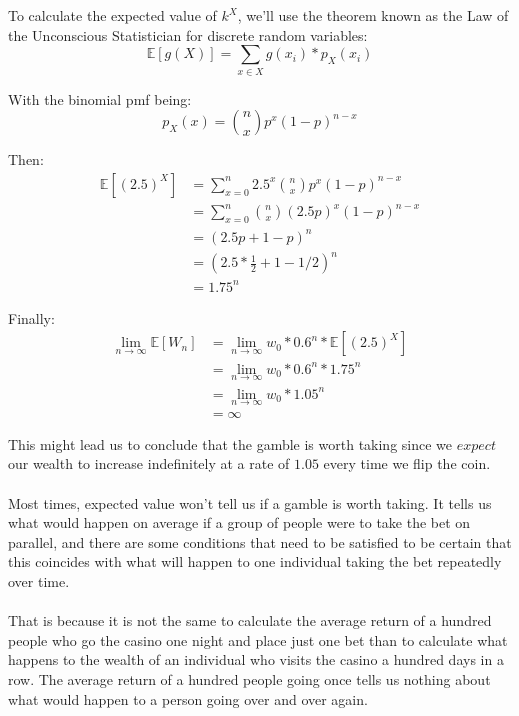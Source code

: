 \documentclass[12pt]{article}
\begin{document}
To calculate the expected value of $k^X$, we'll use the theorem known as the Law of the Unconscious Statistician for discrete random variables:
\begin{equation}
    \mathbb{E}[g(X)] = \sum\limits_{x \in X} g(x_i)*p_X(x_i)
\end{equation}

With the binomial pmf being:
\begin{equation}
    p_X(x) = {n \choose x} p^x (1-p)^{n-x}
\end{equation}

Then:
\begin{equation*}
  \begin{split}
    \mathbb{E}[(2.5)^X] &= \sum\limits_{x=0}^{n} 2.5^x {n \choose x} p^x (1-p)^{n-x}\\
    &= \sum\limits_{x=0}^{n} {n \choose x} (2.5p)^x (1-p)^{n-x}\\
    &= (2.5p + 1 - p)^n\\
    &= (2.5 * \frac{1}{2} + 1 - 1/2)^n\\
    & = 1.75^n
  \end{split}
\end{equation*}

Finally:
\begin{equation*}
  \begin{split}
    \lim_{n\to\infty}\mathbb{E}[W_n] &= \lim_{n\to\infty} w_0 * 0.6^n * \mathbb{E}[(2.5)^X]\\
    &= \lim_{n\to\infty} w_0 * 0.6^n * 1.75^n\\
    &= \lim_{n\to\infty} w_0 * 1.05^n\\
    &= \infty
  \end{split}
\end{equation*}

This might lead us to conclude that the gamble is worth taking since we $expect$ our wealth to increase indefinitely at a rate of $1.05$ every time we flip the coin.
\\\\
Most times, expected value won't tell us if a gamble is worth taking. It tells us what would happen on average if a group of people were to take the bet on parallel, and there are some conditions that need to be satisfied to be certain that this coincides with what will happen to one individual taking the bet repeatedly over time.
\\\\
That is because it is not the same to calculate the average return of a hundred people who go the casino one night and place just one bet than to calculate what happens to the wealth of an individual who visits the casino a hundred days in a row. The average return of a hundred people going once tells us nothing about what would happen to a person going over and over again. 
\end{document}
